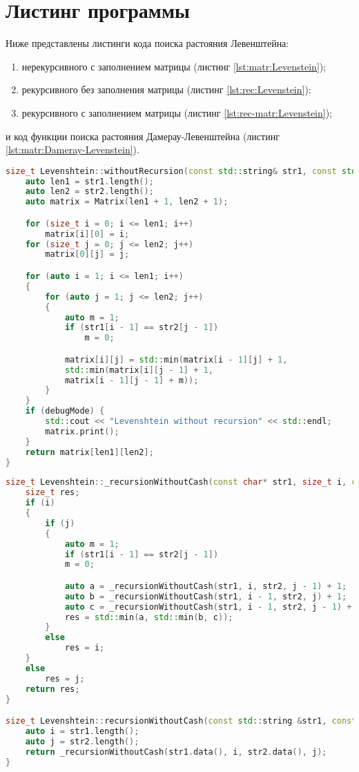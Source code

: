    \section{Листинг программы}
        Ниже представлены листинги кода поиска растояния Левенштейна: \begin{enumerate}
            \item нерекурсивного с заполнением матрицы (листинг \ref{lst:matr:Levenstein});
            \item рекурсивного без заполнения матрицы (листинг \ref{lst:rec:Levenstein});
            \item рекурсивного с заполнением матрицы (листинг \ref{lst:rec-matr:Levenstein});
        \end{enumerate}
        
        и код функции поиска растояния Дамерау-Левенштейна (листинг \ref{lst:matr:Dameray-Levenstein}).

        \begin{lstlisting}[language=C++, label=lst:matr:Levenstein, caption=Функция нерекурсивного поиска с заполнением матрицы]
size_t Levenshtein::withoutRecursion(const std::string& str1, const std::string& str2, bool debugMode) {
    auto len1 = str1.length();
    auto len2 = str2.length();
    auto matrix = Matrix(len1 + 1, len2 + 1);

    for (size_t i = 0; i <= len1; i++)
        matrix[i][0] = i;
    for (size_t j = 0; j <= len2; j++)
        matrix[0][j] = j;

    for (auto i = 1; i <= len1; i++)
    {
        for (auto j = 1; j <= len2; j++)
        {
            auto m = 1;
            if (str1[i - 1] == str2[j - 1])
                m = 0;

            matrix[i][j] = std::min(matrix[i - 1][j] + 1,
            std::min(matrix[i][j - 1] + 1,
            matrix[i - 1][j - 1] + m));
        }
    }
    if (debugMode) {
        std::cout << "Levenshtein without recursion" << std::endl;
        matrix.print();
    }
    return matrix[len1][len2];
}
        \end{lstlisting}

        \begin{lstlisting}[language=C++, label=lst:rec:Levenstein, caption=Функция рекурсивного поиска без заполнения матрицы]
size_t Levenshtein::_recursionWithoutCash(const char* str1, size_t i, const char* str2, size_t j) {
    size_t res;
    if (i)
    {
        if (j)
        {
            auto m = 1;
            if (str1[i - 1] == str2[j - 1])
            m = 0;

            auto a = _recursionWithoutCash(str1, i, str2, j - 1) + 1;
            auto b = _recursionWithoutCash(str1, i - 1, str2, j) + 1;
            auto c = _recursionWithoutCash(str1, i - 1, str2, j - 1) + m;
            res = std::min(a, std::min(b, c));
        }
        else
            res = i;
    }
    else
        res = j;
    return res;
}

size_t Levenshtein::recursionWithoutCash(const std::string &str1, const std::string &str2) {
    auto i = str1.length();
    auto j = str2.length();
    return _recursionWithoutCash(str1.data(), i, str2.data(), j);
}
        \end{lstlisting}

